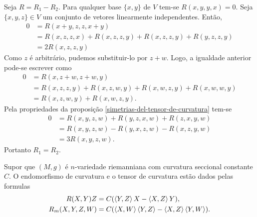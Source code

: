 \begin{demonstracao}
	Seja $R = R_1 - R_2$.
	Para qualquer base $\{x,y\}$ de $V$ tem-se $R(x,y,y,x)=0$.
	Seja $\{x,y,z\} \in V$ um conjunto de vetores linearmente independentes. Então,
	\begin{align*}
	0 &= R(x+y,z,z,x+y)\\
	&= R(x,z,z,x) + R(x,z,z,y) + R(x,z,z,y) + R(y,z,z,y)\\
	&= 2R(x,z,z,y)
	\end{align*}
	Como $z$ é arbitrário, pudemos substituir-lo por $z+w$. Logo, a igualdade anterior pode-se escrever como
	\begin{align*}
	0 &= R(x,z+w,z+w,y)\\
	&= R(x,z,z,y) + R(x,z,w,y) + R(x,w,z,y) + R(x,w,w,y)\\
	&= R(x,z,w,y) + R(x,w,z,y).
	\end{align*}
	Pela propriedades da proposição \ref{simetrias-del-tensor-de-curvatura} tem-se
	\begin{align*}
	0 &= R(x,y,z,w) + R(y,z,x,w) + R(z,x,y,w)\\
	&= R(x,y,z,w) - R(y,x,z,w) - R(x,z,y,w)\\
	&= 3R(x,y,z,w).
	\end{align*}
	Portanto $R_1 = R_2$.
\end{demonstracao}

\begin{proposicao}
	Supor que $(M,g)$ é $n$-variedade riemanniana com curvatura seccional constante $C$. O endomorfismo de curvatura e o tensor de curvatura estão dados pelas formulas
	\begin{align*}
	R(X,Y)Z &= C(\left\langle Y,Z \right\rangle X - \left\langle X,Z \right\rangle Y),\\
	R_m(X,Y,Z,W) &= C(\left\langle X,W \right\rangle \left\langle Y,Z \right\rangle - \left\langle X,Z \right\rangle \left\langle Y,W \right\rangle).
	\end{align*}
\end{proposicao}

